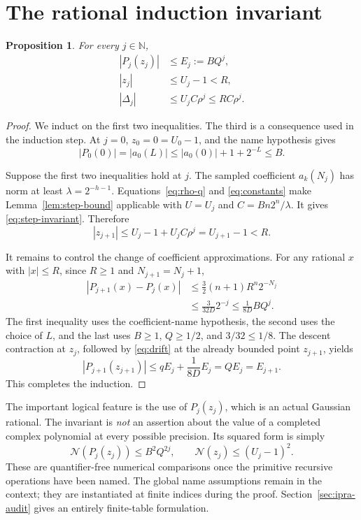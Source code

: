 \documentclass[11pt,letterpaper]{article}
\newtheorem{proposition}[theorem]{Proposition}
\theoremstyle{definition}\newtheorem{definition}[theorem]{Definition}
\theoremstyle{remark}\newtheorem{remark}[theorem]{Remark}
\newcommand{\N}{\mathbb N}\newcommand{\Q}{\mathbb Q}
\newcommand{\nn}[1]{\mathcal N(#1)}
\begin{document}
\section{The rational induction invariant}
\label{sec:invariant}

\begin{proposition}
\label{prop:invariant}
For every $j\in\N$,
\begin{align}
 |P_j(z_j)|&\le E_j:=BQ^j,\label{eq:residual-invariant}\\
 |z_j|&\le U_j-1<R,\label{eq:position-invariant}\\
 |\Delta_j|&\le U_jC\rho^j\le RC\rho^j.
 \label{eq:step-invariant}
\end{align}
\end{proposition}

\begin{proof}
We induct on the first two inequalities. The third is a consequence used
in the induction step. At $j=0$, $z_0=0=U_0-1$, and the name hypothesis
gives
\[
 |P_0(0)|=|a_0(L)|\le|a_0(0)|+1+2^{-L}\le B.
\]

Suppose the first two inequalities hold at $j$. The sampled coefficient
$a_k(N_j)$ has norm at least $\lambda=2^{-h-1}$.
Equations~\eqref{eq:rho-q} and \eqref{eq:constants} make
Lemma~\ref{lem:step-bound} applicable with $U=U_j$ and
$C=Bn2^n/\lambda$. It gives \eqref{eq:step-invariant}. Therefore
\[
 |z_{j+1}|\le U_j-1+U_jC\rho^j=U_{j+1}-1<R.
\]

It remains to control the change of coefficient approximations.
For any rational $x$ with $|x|\le R$, since $R\ge1$ and $N_{j+1}=N_j+1$,
\begin{align}
 |P_{j+1}(x)-P_j(x)|
 &\le\frac32(n+1)R^n2^{-N_j}\nonumber\\
 &\le\frac3{32D}2^{-j}
 \le\frac1{8D}BQ^j.
 \label{eq:drift}
\end{align}
The first inequality uses the coefficient-name hypothesis, the second
uses the choice of $L$, and the last uses $B\ge1$, $Q\ge1/2$, and
$3/32\le1/8$. The descent contraction at $z_j$, followed by
\eqref{eq:drift} at the already bounded point $z_{j+1}$, yields
\[
 |P_{j+1}(z_{j+1})|
 \le qE_j+\frac1{8D}E_j
 =QE_j=E_{j+1}.
\]
This completes the induction.
\end{proof}

The important logical feature is the use of $P_j(z_j)$, which is an actual
Gaussian rational. The invariant is \emph{not} an assertion about the value
of a completed complex polynomial at every possible precision. Its squared
form is simply
\begin{equation}
 \nn{P_j(z_j)}\le B^2Q^{2j},\qquad
 \nn{z_j}\le(U_j-1)^2.
 \label{eq:qf-invariant}
\end{equation}
These are quantifier-free numerical comparisons once the primitive
recursive operations have been named. The global name assumptions remain
in the context; they are instantiated at finite indices during the proof.
Section~\ref{sec:ipra-audit} gives an entirely finite-table formulation.
\end{document}
